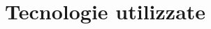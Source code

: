\documentclass[../SpecificaTecnica.tex]{subfiles}
\begin{document}
\section{Tecnologie utilizzate}
	
\end{document}
